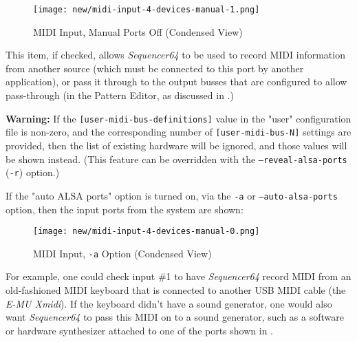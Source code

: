 
\begin{figure}[H]
   \centering 
   \texttt{[image: new/midi-input-4-devices-manual-1.png]}
   \caption{MIDI Input, Manual Ports Off (Condensed View)}
   \label{fig:seq64_midi_input_4_devices_manual_1}
\end{figure}



   This item, if checked, allows \textsl{Sequencer64} to be used to record MIDI
   information from another source (which must be connected to this port by
   another application), or pass it through to the output busses
   that are configured to allow pass-through
   (in the Pattern Editor, as discussed in 
   .)

   \textbf{Warning:}
   If the 
   \texttt{[user-midi-bus-definitions]} value in the "user" configuration file
   is non-zero, and the
   corresponding number of
   \texttt{[user-midi-bus-N]} settings are provided, then
   the list of existing hardware will be ignored, and those values will be
   shown instead.
   (This feature can be overridden with the
   \texttt{--reveal-alsa-ports} (\texttt{-r}) option.)


   If the "auto ALSA ports" option is turned on, via the \texttt{-a} or
   \texttt{--auto-alsa-ports} option, then
   the input ports from the system are shown:

\begin{figure}[H]
   \centering 
   \texttt{[image: new/midi-input-4-devices-manual-0.png]}
   \caption{MIDI Input, \texttt{-a} Option (Condensed View)}
   \label{fig:seq64_midi_input_4_devices_manual_0}
\end{figure}

   For example, one could check input \#1 to have \textsl{Sequencer64} record
   MIDI from an old-fashioned MIDI keyboard that is connected to another
   USB MIDI cable (the \textsl{E-MU Xmidi}).  If the keyboard didn't have a
   sound generator, one would also want \textsl{Sequencer64} to pass this MIDI
   on to a sound generator, such as a software or hardware synthesizer attached
   to one of the ports shown in
   .


